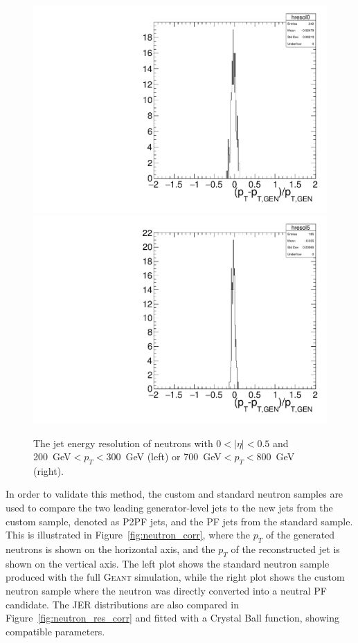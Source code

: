 \begin{figure}[ht]
  \centering
 \includegraphics[width=.48\textwidth]{pt_res_ptbin_0.pdf} \hfill
\includegraphics[width=.48\textwidth]{pt_res_ptbin_5.pdf}
 \caption{The jet energy resolution of neutrons with $0< |\eta| < 0.5$ and \SI{200}{GeV}$<p_T<$\SI{300}{GeV} (left) or \SI{700}{GeV}$<p_T<$\SI{800}{GeV} (right).}
 \label{fig:neutron_res}
\end{figure}

In order to validate this method, the custom and standard neutron samples are used to compare the two leading generator-level jets to the new jets from the custom sample, denoted as P2PF jets, and the \ac{PF} jets from the standard sample. This is illustrated in Figure~\ref{fig:neutron_corr}, where the $p_T$ of the generated neutrons is shown on the horizontal axis, and the $p_T$ of the reconstructed jet is shown on the vertical axis. The left plot shows the standard neutron sample produced with the full \textsc{Geant} simulation, while the right plot shows the custom neutron sample where the neutron was directly converted into a neutral \ac{PF} candidate. The \ac{JER} distributions are also compared in Figure~\ref{fig:neutron_res_corr} and fitted with a Crystal Ball function, showing compatible parameters.


